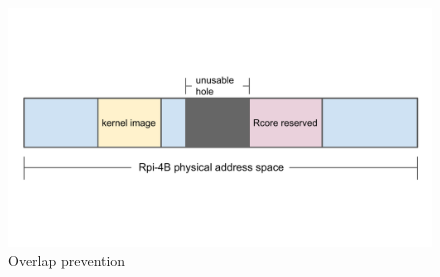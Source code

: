 \begin{figure}[H]
    \includegraphics[scale=0.60]{figures/rcore_reserved.pdf}
    \caption{Overlap prevention}
    \label{fig:rcorereserved}
\end{figure}

